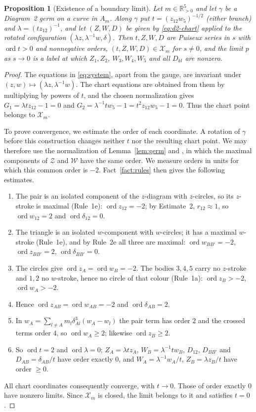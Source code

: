 \documentclass[11pt]{amsart}
\newtheorem{proposition}[theorem]{Proposition}
\theoremstyle{definition}
\theoremstyle{remark}
\newcommand{\Rp}{\mathbb{R}_{>0}}
\newcommand{\ord}{\operatorname{ord}}
\begin{document}
\begin{proposition}[Existence of a boundary limit]\label{prop:d2-cover}
Let $m\in\Rp^5$ and let $\gamma$ be a Diagram~2 germ on a curve in $A_m$.  Along $\gamma$ put
$t=(z_{12}w_5)^{-1/2}$ \textup{(}either branch\textup{)} and $\lambda=(tz_{12})^{-1}$, and let
$(Z,W,D)$ be given by \eqref{eq:d2-chart} applied to the rotated configuration
$(\lambda z,\lambda^{-1}w,\delta)$.  Then $t,Z,W,D$ are Puiseux series in $s$ with $\ord t>0$ and
nonnegative orders, $(t,Z,W,D)\in\mathcal X_m$ for $s\ne0$, and the limit $p$ as $s\to0$ is a label at
which $Z_1,Z_2$, $W_3,W_4,W_5$ and all $D_{kl}$ are nonzero.
\end{proposition}

\begin{proof}
{The equations in \eqref{eq:system}, apart from the gauge, are invariant
under $(z,w)\mapsto(\lambda z,\lambda^{-1}w)$.  The chart equations are obtained from them by
multiplying by powers of $t$, and the chosen normalization gives $G_1=\lambda tz_{12}-1=0$
and $G_2=\lambda^{-1}tw_5-1=t^2z_{12}w_5-1=0$.
Thus the chart point belongs to $\mathcal X_m$.

To prove convergence, we estimate the order of each coordinate.  A rotation of $\gamma$
before this construction changes neither $t$ nor the resulting chart point.
We may therefore use the normalization of Lemma~\ref{lem:germ} and \cite[p.~547]{AK}, in
which the maximal components of $\mathcal Z$ and $\mathcal W$ have the same order.
We measure orders in units for which this common order is $-2$.
Fact~\ref{fact:rules} then gives the following estimates.}
\begin{enumerate}
  \item The pair is an isolated component of the $z$-diagram with $z$-circles, so its $z$-stroke
  is maximal (Rule~1e): $\ord z_{12}=-2$; by Estimate~2, $r_{12}\approx1$, so $\ord w_{12}=2$ and
  $\ord\delta_{12}=0$.
  \item The triangle is an isolated $w$-component with $w$-circles; it has a maximal $w$-stroke
  (Rule~1e), and by Rule~2e all three are maximal: $\ord w_{BB'}=-2$, $\ord z_{BB'}=2$,
  $\ord\delta_{BB'}=0$.
  \item The circles give $\ord z_A=\ord w_B=-2$.  The bodies $3,4,5$ carry no $z$-stroke and
  $1,2$ no $w$-stroke, hence no circle of that colour (Rule~1a): $\ord z_B>-2$, $\ord w_A>-2$.
  \item Hence $\ord z_{AB}=\ord w_{AB}=-2$ and $\ord\delta_{AB}=2$.
  \item In $w_A=\sum_{l\ne A}m_l\delta_{Al}^3(w_A-w_l)$ the pair term has order $2$ and the
  crossed terms order $4$, so $\ord w_A\ge2$; likewise $\ord z_B\ge2$.
  \item So $\ord t=2$ and $\ord\lambda=0$; $Z_A=\lambda tz_A$, $W_B=\lambda^{-1}tw_B$, $D_{12}$,
  $D_{BB'}$ and $D_{AB}=\delta_{AB}/t$ have order exactly $0$, and $W_A=\lambda^{-1}w_A/t$,
  $Z_B=\lambda z_B/t$ have order $\ge0$.
\end{enumerate}
{All chart coordinates consequently converge, with $t\to0$.
Those of order exactly $0$ have nonzero limits.
Since $\mathcal X_m$ is closed, the limit belongs to it and satisfies $t=0$.}
\end{proof}
\end{document}
